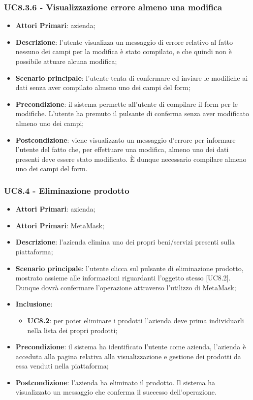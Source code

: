 \subsubsection{UC8.3.6 - Visualizzazione errore almeno una modifica}
\begin{itemize}
	\item \textbf{Attori Primari}: azienda;
	\item \textbf{Descrizione}:
	l'utente visualizza un messaggio di errore relativo al fatto nessuno dei campi per la modifica è stato compilato, e che quindi non è possibile attuare alcuna modifica;
	\item \textbf{Scenario principale}: l'utente tenta di confermare ed inviare le modifiche ai dati senza aver compilato almeno uno dei campi del form;
	\item \textbf{Precondizione}: il sistema permette all'utente di compilare il form per le modifiche. L'utente ha premuto il pulsante di conferma senza aver modificato almeno uno dei campi; 
	\item \textbf{Postcondizione}:
	viene visualizzato un messaggio d'errore per informare l'utente del fatto che, per effettuare una modifica, almeno uno dei dati presenti deve essere stato modificato. È dunque necessario compilare almeno uno dei campi del form.
\end{itemize}

\subsubsection{UC8.4 - Eliminazione prodotto}
\begin{itemize}
	\item \textbf{Attori Primari}: azienda;
	\item \textbf{Attori Primari}: MetaMask\glo;
	\item \textbf{Descrizione}:
	l'azienda elimina uno dei propri beni/servizi presenti sulla piattaforma;
	\item \textbf{Scenario principale}: l'utente clicca sul pulsante di eliminazione prodotto, mostrato assieme alle informazioni riguardanti l'oggetto stesso [UC8.2]. Dunque dovrà confermare l'operazione attraverso l'utilizzo di MetaMask\glo;
	\item \textbf{Inclusione}:
	\begin{itemize}
		\item \textbf{UC8.2}: per poter eliminare i prodotti l'azienda deve prima individuarli nella lista dei propri prodotti;
	\end{itemize}
	\item \textbf{Precondizione}: il sistema ha identificato l'utente come azienda, l'azienda è acceduta alla pagina relativa alla visualizzazione e gestione dei prodotti da essa venduti nella piattaforma;
	\item \textbf{Postcondizione}: l'azienda ha eliminato il prodotto. Il sistema ha visualizzato un messaggio che conferma il successo dell'operazione.
\end{itemize}


